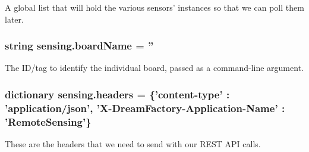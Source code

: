 A global list that will hold the various sensors' instances so that we can poll them later. 

\hypertarget{namespacesensing_a7d59d9b021482661d93cbf2120dfa030}{
\subsubsection[{board\-Name}]{\setlength{\rightskip}{0pt plus 5cm}string sensing.\-board\-Name = ''}}\label{namespacesensing_a7d59d9b021482661d93cbf2120dfa030}


The I\-D/tag to identify the individual board, passed as a command-\/line argument. 

\hypertarget{namespacesensing_a10bdd4ea61df5e84854a462509e3c7d5}{
\subsubsection[{headers}]{\setlength{\rightskip}{0pt plus 5cm}dictionary sensing.\-headers = \{'content-\/type' \-: 'application/json', 'X-\/Dream\-Factory-\/Application-\/Name' \-: 'Remote\-Sensing'\}}}\label{namespacesensing_a10bdd4ea61df5e84854a462509e3c7d5}


These are the headers that we need to send with our R\-E\-S\-T A\-P\-I calls. 

